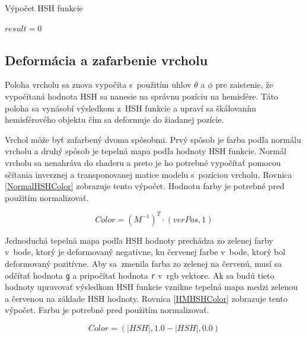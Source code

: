 \begin{algorithm}[b!]
\caption{Výpočet HSH funkcie}\label{VypocetHSHpseu}
$result = 0$\\
\end{algorithm}

\subsection*{Deformácia a zafarbenie vrcholu}
Poloha vrcholu sa znova vypočíta s~použitím uhlov $\theta$ a $\phi$ pre zaistenie, že vypočítaná hodnota HSH sa nanesie na správnu pozíciu na hemisfére. Táto poloha sa vynásobí výsledkom z~HSH funkcie a upraví sa škálovaním hemisférového objektu čím sa deformuje do žiadanej pozície.

Vrchol môže byť zafarbený dvoma spôsobmi. Prvý spôsob je farba podľa normálu vrcholu a druhý spôsob je tepelná mapa podľa hodnoty HSH funkcie. Normál vrcholu sa nenahráva do shaderu a preto je ho potrebné vypočítať pomocou sčítania inverznej a transponovanej matice modelu s~pozíciou vrcholu. Rovnica \ref{NormalHSHColor} zobrazuje tento výpočet. Hodnotu farby je potrebné pred použitím normalizovať.

\begin{equation} \label{NormalHSHColor}
Color = (M^{-1})^T \cdot (verPos, 1)
\end{equation}

Jednoduchá tepelná mapa podľa HSH hodnoty prechádza zo zelenej farby v~bode, ktorý je deformovaný negatívne, ku červenej farbe v~bode, ktorý bol deformovaný pozitívne. Aby sa~zmenila farba zo zelenej na červenú, musí sa odčítať hodnota \verb|g| a pripočítať hodnota \verb|r| v~rgb vektore. Ak sa budú tieto hodnoty upravovať výsledkom HSH funkcie vznikne tepelná mapa medzi zelenou a červenou na základe HSH hodnoty. Rovnica \ref{HMHSHColor} zobrazuje tento výpočet. Farbu je potrebné pred použitím normalizovať.

\begin{equation} \label{HMHSHColor}
Color = (|HSH|, 1.0 - |HSH|, 0.0)
\end{equation}

